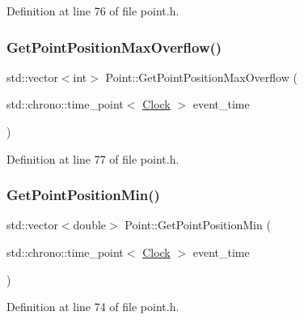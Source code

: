 Definition at line 76 of file point.\+h.

\mbox{\label{class_point_a228830fddb8b4d90e910e0774796e635}} 
\subsubsection{\texorpdfstring{Get\+Point\+Position\+Max\+Overflow()}{GetPointPositionMaxOverflow()}}
{\footnotesize\ttfamily std\+::vector$<$int$>$ Point\+::\+Get\+Point\+Position\+Max\+Overflow (\begin{DoxyParamCaption}\item[{std\+::chrono\+::time\+\_\+point$<$ \hyperlink{universe_8h_a0ef8d951d1ca5ab3cfaf7ab4c7a6fd80}{Clock} $>$}]{event\+\_\+time }\end{DoxyParamCaption})\hspace{0.3cm}{\ttfamily [inline]}}



Definition at line 77 of file point.\+h.

\mbox{\label{class_point_a6182865226595813eccadbe25d38cd9e}} 
\subsubsection{\texorpdfstring{Get\+Point\+Position\+Min()}{GetPointPositionMin()}}
{\footnotesize\ttfamily std\+::vector$<$double$>$ Point\+::\+Get\+Point\+Position\+Min (\begin{DoxyParamCaption}\item[{std\+::chrono\+::time\+\_\+point$<$ \hyperlink{universe_8h_a0ef8d951d1ca5ab3cfaf7ab4c7a6fd80}{Clock} $>$}]{event\+\_\+time }\end{DoxyParamCaption})\hspace{0.3cm}{\ttfamily [inline]}}



Definition at line 74 of file point.\+h.

\mbox{\label{class_point_a3a0caf079555585799754b3cab12129c}} 
